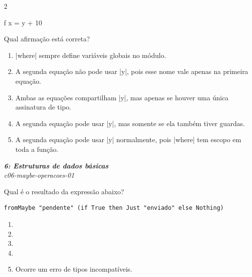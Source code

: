 \documentclass[a4paper,10pt,brazil]{article}
\begin{document}
\begin{multicols}{2}
\begin{haskellcode}
f x = y + 10
\end{haskellcode}
Qual afirmação está correta?

\begin{enumerate}
  \item \haskellinline|where| sempre define variáveis globais no módulo.

  \item A segunda equação não pode usar \haskellinline|y|, pois esse nome vale apenas na primeira equação.

  \item Ambas as equações compartilham \haskellinline|y|, mas apenas se houver uma única assinatura de tipo.

  \item A segunda equação pode usar \haskellinline|y|, mas somente se ela também tiver guardas.

  \item A segunda equação pode usar \haskellinline|y| normalmente, pois \haskellinline|where| tem escopo em toda a função.


\end{enumerate}

\begin{flushright}
  \footnotesize
  \textit{\textbf{6: Estruturas de dados básicas}}\\
  \textit{c06-maybe-operacoes-01}\\

\end{flushright}
Qual é o resultado da expressão abaixo?
\begin{verbatim}
fromMaybe "pendente" (if True then Just "enviado" else Nothing)
\end{verbatim}

\begin{enumerate}
  \item {}

  \item {}

  \item {}

  \item {}

  \item Ocorre um erro de tipos incompatíveis.


\end{enumerate}


\end{multicols}
\end{document}
